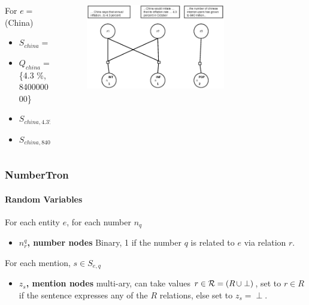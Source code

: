 \documentclass{beamer}
\begin{document}
\begin{frame}
\begin{columns}[T] %
\begin{column}{.30\textwidth}
For  $e =$ (China)
\begin{itemize}
\setlength \itemsep{1em}
\item $S_{china} = \{(i), (ii), (iii)\}$  
\item $Q_{china} = $ \{4.3 \%, 840000000\}
\item $S_{china, 4.3 \%} = \{(i), (ii)\}$ 
\item $S_{china, 840000000} = \{(iii)\}$ 
\end{itemize}

\end{column}%

\hfill%

\begin{column}{.68\textwidth}
\begin{figure}
\includegraphics[width=0.7\textwidth]{images/numbertronmodel.eps}
\end{figure}

\end{column}%

\end{columns}
\end{frame}


\begin{frame}
\frametitle{NumberTron}
\framesubtitle{Random Variables}
For each entity $e$, for each number $n_q$
\begin{itemize}
\item \textbf{$n_r^q$, number nodes} Binary, 1 if the number $q$ is related to $e$ via relation $r$. 
\end{itemize}
\vspace{3em}
For each mention, $s \in S_{e,q}$
\begin{itemize}

\item \textbf{$z_s$, mention nodes} multi-ary, can take values $r \in {\cal R} = (R\, \cup \perp)$, set to $r \in R$ if the sentence expresses any of the $R$ relations, else set to $z_s = \perp$.
\end{itemize}
\end{frame}
\end{document}
